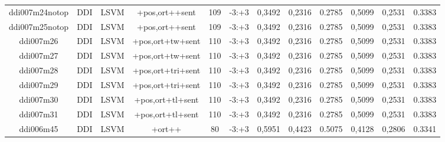 \documentclass[a4paper]{article}
\begin{document}
\begin{landscape}
\begin{center}
\begin{tabular}{ |c|c|c|c|c|c|c|c|c|c|c|c|}
 
 	
 	\small{ ddi007m24notop } & \small{ DDI} & \small{  LSVM }  & +pos,ort++sent  &  109 &  \small{  -3:+3 }  &  0,3492 & 0,2316 & 0.2785  &  0,5099 & 0,2531 & 0.3383 \\
 	

 
 	
 	\small{ ddi007m25notop } & \small{ DDI} & \small{  LSVM }  & +pos,ort++sent  &  109 &  \small{  -3:+3 }  &  0,3492 & 0,2316 & 0.2785  &  0,5099 & 0,2531 & 0.3383 \\
 	

 
 	
 	\small{ ddi007m26 } & \small{ DDI} & \small{  LSVM }  & +pos,ort+tw+sent  &  110 &  \small{  -3:+3 }  &  0,3492 & 0,2316 & 0.2785  &  0,5099 & 0,2531 & 0.3383 \\
 	

 
 	
 	\small{ ddi007m27 } & \small{ DDI} & \small{  LSVM }  & +pos,ort+tw+sent  &  110 &  \small{  -3:+3 }  &  0,3492 & 0,2316 & 0.2785  &  0,5099 & 0,2531 & 0.3383 \\
 	

 
 	
 	\small{ ddi007m28 } & \small{ DDI} & \small{  LSVM }  & +pos,ort+tri+sent  &  110 &  \small{  -3:+3 }  &  0,3492 & 0,2316 & 0.2785  &  0,5099 & 0,2531 & 0.3383 \\
 	

 
 	
 	\small{ ddi007m29 } & \small{ DDI} & \small{  LSVM }  & +pos,ort+tri+sent  &  110 &  \small{  -3:+3 }  &  0,3492 & 0,2316 & 0.2785  &  0,5099 & 0,2531 & 0.3383 \\
 	

 
 	
 	\small{ ddi007m30 } & \small{ DDI} & \small{  LSVM }  & +pos,ort+tl+sent  &  110 &  \small{  -3:+3 }  &  0,3492 & 0,2316 & 0.2785  &  0,5099 & 0,2531 & 0.3383 \\
 	

 
 	
 	\small{ ddi007m31 } & \small{ DDI} & \small{  LSVM }  & +pos,ort+tl+sent  &  110 &  \small{  -3:+3 }  &  0,3492 & 0,2316 & 0.2785  &  0,5099 & 0,2531 & 0.3383 \\
 	

 
 	
 	\small{ ddi006m45 } & \small{ DDI} & \small{  LSVM }  & +ort++  &  80 &  \small{  -3:+3 }  &  0,5951 & 0,4423 & 0.5075  &  0,4128 & 0,2806 & 0.3341 \\
 	


\end{tabular}
\end{center}
\end{landscape}
\end{document}
